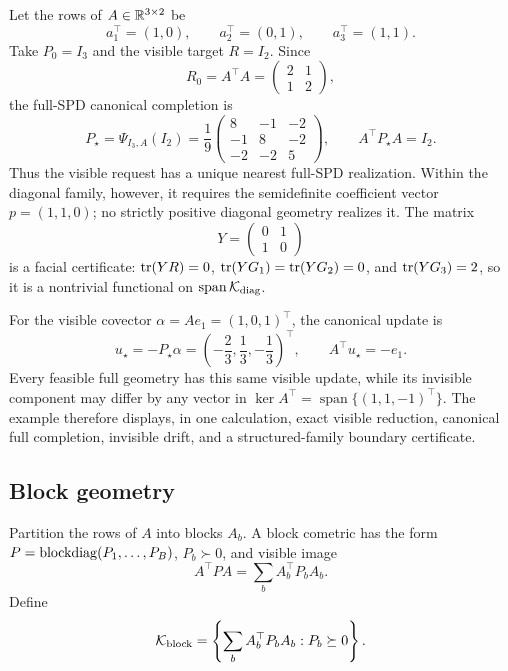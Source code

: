 \begin{example}
\label{ex:worked-training-channel}
Let the rows of \(A\in\mathbb R^{3\times2}\) be
\[
  a_1^\top=(1,0),
  \qquad
  a_2^\top=(0,1),
  \qquad
  a_3^\top=(1,1).
\]
Take \(P_0=I_3\) and the visible target \(R=I_2\).  Since
\[
  R_0=A^\top A=\begin{pmatrix}2&1\\1&2\end{pmatrix},
\]
the full-SPD canonical completion is
\[
  P_\star=\Psi_{I_3,A}(I_2)
  =\frac19
  \begin{pmatrix}
    8&-1&-2\\
    -1&8&-2\\
    -2&-2&5
  \end{pmatrix},
  \qquad A^\top P_\star A=I_2.
\]
Thus the visible request has a unique nearest full-SPD realization.  Within
the diagonal family, however, it requires the semidefinite coefficient vector
\(p=(1,1,0)\); no strictly positive diagonal geometry realizes it.  The
matrix
\[
  Y=\begin{pmatrix}0&1\\1&0\end{pmatrix}
\]
is a facial certificate: \(\operatorname{tr}(YR)=0\),
\(\operatorname{tr}(YG_1)=\operatorname{tr}(YG_2)=0\), and \(\operatorname{tr}(YG_3)=2\), so it is a nontrivial
functional on \(\operatorname{span}\mathcal K_{\mathrm{diag}}\).

For the visible covector \(\alpha=Ae_1=(1,0,1)^\top\), the canonical update
is
\[
  u_\star=-P_\star\alpha
  =\left(-\frac23,\frac13,-\frac13\right)^\top,
  \qquad A^\top u_\star=-e_1.
\]
Every feasible full geometry has this same visible update, while its invisible
component may differ by any vector in
\(\ker A^\top=\operatorname{span}\{(1,1,-1)^\top\}\).  The example
therefore displays, in one calculation, exact visible reduction, canonical
full completion, invisible drift, and a structured-family boundary
certificate.
\end{example}

\subsection{Block geometry}

Partition the rows of \(A\) into blocks \(A_b\).  A block cometric has the
form \(P=\operatorname{blockdiag}(P_1,\ldots,P_B)\), \(P_b\succ0\), and visible image
\begin{equation}
  A^\top PA=\sum_bA_b^\top P_bA_b.
  \label{eq:block-image}
\end{equation}
Define
\[
  \mathcal K_{\mathrm{block}}
  =\left\{\sum_bA_b^\top P_bA_b:P_b\succeq0\right\}.
\]

